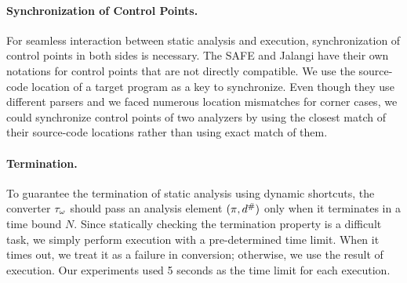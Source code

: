 \paragraph{Synchronization of Control Points.}
For seamless interaction between static analysis and {\sealed} execution,
synchronization of control points in both sides is necessary.
The SAFE and Jalangi have their own notations for control points that are not directly
compatible.
We use the source-code location of a target program as a key to synchronize.
Even though they use different parsers and we faced numerous location mismatches for corner cases,
we could synchronize control points of two analyzers by using the closest match
of their source-code locations rather than using exact match of them.

\paragraph{}

\paragraph{Termination.}
To guarantee the termination of static analysis using dynamic shortcuts, the
converter ${\tau}_\omega$ should pass an analysis element $(\pi, {d}^{\#})$
only when it terminates in a time bound $N$.  Since statically checking the
termination property is a difficult task, we simply perform {\sealed}
execution with a pre-determined time limit.  When it times out,
we treat it as a failure in conversion;
otherwise, we use the result of {\sealed} execution.  Our experiments used
5 seconds as the time limit for each {\sealed} execution.





